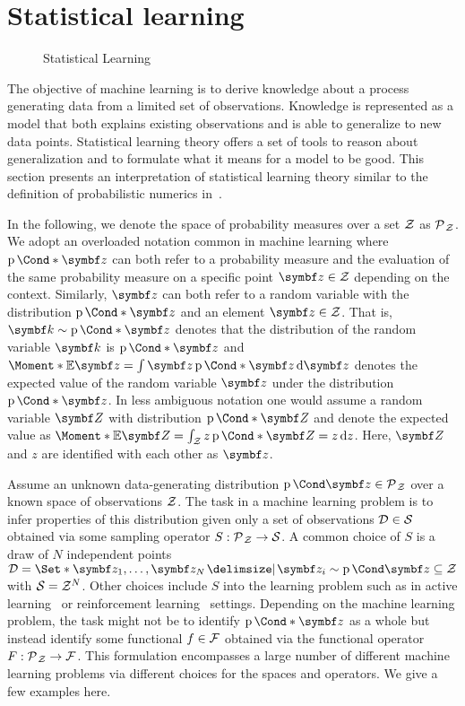 \section{Statistical learning}
\begin{figure}[t]
    \centering
    \caption{
        Statistical Learning
        \label{fig:bayesian_ml:statistical_learning}
    }
\end{figure}
The objective of machine learning is to derive knowledge about a process generating data from a limited set of observations.
Knowledge is represented as a model that both explains existing observations and is able to generalize to new data points.
Statistical learning theory offers a set of tools to reason about generalization and to formulate what it means for a model to be good.
This section presents an interpretation of statistical learning theory similar to the definition of probabilistic numerics in~\parencite{oates_modern_2019,cockayne_bayesian_2019}.

In the following, we denote the space of probability measures over a set $\mathcal{Z}$ as $\operatorname{\mathcal{P}\mkern1mu}_{\mathcal{Z}}$.
We adopt an overloaded notation common in machine learning where $\Prob*{\mat{z}}$ can both refer to a probability measure and the evaluation of the same probability measure on a specific point $\mat{z} \in \Zc$ depending on the context.
Similarly, $\mat{z}$ can both refer to a random variable with the distribution $\Prob*{\mat{z}}$ and an element $\mat{z} \in \Zc$.
That is, $\mat{k} \sim \Prob*{\mat{z}}$ denotes that the distribution of the random variable $\mat{k}$ is $\Prob*{\mat{z}}$ and $\Moment*{\E}{\mat{z}} = \int \mat{z} \Prob*{\mat{z}} \diff \mat{z}$ denotes the expected value of the random variable $\mat{z}$ under the distribution $\Prob*{\mat{z}}$.
In less ambiguous notation one would assume a random variable $\mat{Z}$ with distribution $\Prob*{\mat{Z}}$ and denote the expected value as $\Moment*{\E}{\mat{Z}} = \int_{\Zc} z \Prob*{\mat{Z} = z} \diff z$.
Here, $\mat{Z}$ and $z$ are identified with each other as $\mat{z}$.

Assume an unknown data-generating distribution $\Prob{\mat{z}} \in \Probs{\Zc}$ over a known space of observations $\mathcal{Z}$.
The task in a machine learning problem is to infer properties of this distribution given only a set of observations $\mathcal{D} \in \mathcal{S}$ obtained via some sampling operator $S : \operatorname{\mathcal{P}\mkern1mu}_{\mathcal{Z}} \to \mathcal{S}$.
A common choice of $S$ is a draw of $N$ independent points $\Dc = \Set*{\mat{z_1}, \dots, \mat{z_N} \with \mat{z_i} \sim \Prob{\mat{z}}} \subseteq \Zc$ with $\mathcal{S} = \mathcal{Z}^N$.
Other choices include $S$ into the learning problem such as in active learning~\parencite{murphy_machine_2012} or reinforcement learning~\parencite{sutton_reinforcement_2018} settings.
Depending on the machine learning problem, the task might not be to identify $\Prob*{\mat{z}}$ as a whole but instead identify some functional $f \in \mathcal{F}$ obtained via the functional operator $F : \operatorname{\mathcal{P}\mkern1mu}_{\mathcal{Z}} \to \mathcal{F}$.
This formulation encompasses a large number of different machine learning problems via different choices for the spaces and operators.
We give a few examples here.

